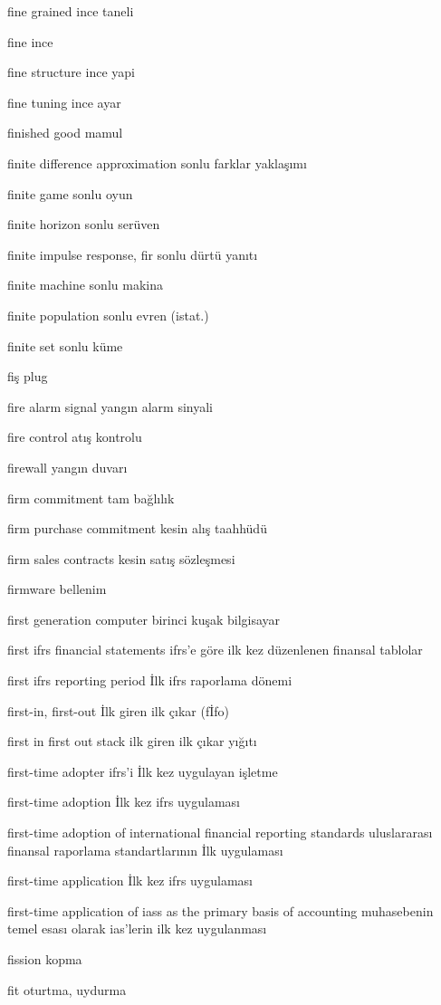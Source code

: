 \documentclass[12pt,fleqn]{article}\usepackage{../../common}
\begin{document}
fine grained ince taneli

fine ince

fine structure ince yapi

fine tuning ince ayar

finished good mamul

finite difference approximation sonlu farklar yaklaşımı

finite game sonlu oyun

finite horizon sonlu serüven

finite impulse response, fir sonlu dürtü yanıtı

finite machine sonlu makina

finite population sonlu evren (istat.)

finite set sonlu küme

fiş plug

fire alarm signal yangın alarm sinyali

fire control atış kontrolu

firewall yangın duvarı

firm commitment tam bağlılık

firm purchase commitment kesin alış taahhüdü

firm sales contracts kesin satış sözleşmesi

firmware bellenim

first generation computer birinci kuşak bilgisayar

first ifrs financial statements ifrs'e göre ilk kez düzenlenen finansal tablolar

first ifrs reporting period İlk ifrs raporlama dönemi

first-in, first-out İlk giren ilk çıkar (fİfo)

first in first out stack ilk giren ilk çıkar yığıtı

first-time adopter ifrs'i İlk kez uygulayan işletme

first-time adoption İlk kez ifrs uygulaması

first-time adoption of international financial reporting standards uluslararası finansal raporlama standartlarının İlk uygulaması

first-time application İlk kez ifrs uygulaması

first-time application of iass as the primary basis of accounting muhasebenin temel esası olarak ias'lerin ilk kez uygulanması

fission kopma

fit oturtma, uydurma
\end{document}
